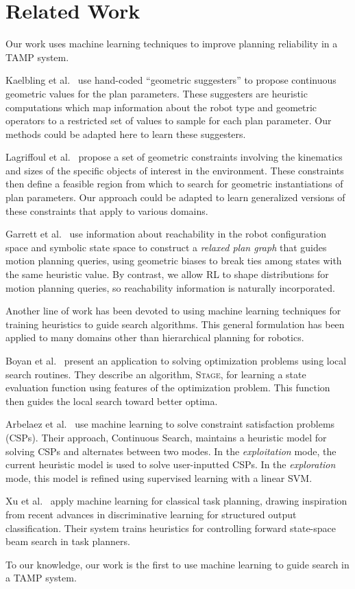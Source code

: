 \section{Related Work}
Our work uses machine learning techniques to improve planning reliability in a TAMP system.

Kaelbling et al.~\cite{kaelbling2011hierarchical} use hand-coded ``geometric suggesters'' to propose
continuous geometric values for the plan parameters. These suggesters are heuristic
computations which map information about the robot type and geometric operators to a restricted
set of values to sample for each plan parameter. Our methods could be adapted here to learn these
suggesters.

Lagriffoul et al.~\cite{lagriffoul2014orientation}
propose a set of geometric constraints involving the kinematics and sizes of the specific objects of
interest in the environment. These constraints then define a feasible region from which to search
for geometric instantiations of plan parameters. Our approach could be adapted to learn generalized
versions of these constraints that apply to various domains.

Garrett et al.~\cite{GarrettWAFR14} use information about reachability in the robot configuration
space and symbolic state space to construct a \emph{relaxed plan graph} that guides motion
planning queries, using geometric biases to break ties among states with the same heuristic value.
By contrast, we allow RL to shape distributions for motion planning queries, so reachability information
is naturally incorporated.

Another line of work has been devoted to using machine learning techniques for
training heuristics to guide search algorithms. This general formulation
has been applied to many domains other than hierarchical planning for robotics.

Boyan et al.~\cite{Boyanlearning} present an application to solving optimization
problems using local search routines. They describe an algorithm, \textsc{Stage},
for learning a state evaluation function using features of the optimization problem.
This function then guides the local search toward better optima.

Arbelaez et al.~\cite{hamadisearch} use machine learning to solve constraint
satisfaction problems (CSPs). Their approach, Continuous Search, maintains a heuristic
model for solving CSPs and alternates between two modes. In the \emph{exploitation} mode,
the current heuristic model is used to solve user-inputted CSPs. In the \emph{exploration}
mode, this model is refined using supervised learning with a linear SVM.

Xu et al.~\cite{Xu07discriminativelearning} apply machine learning for classical task
planning, drawing inspiration from recent advances in discriminative learning for
structured output classification. Their system trains heuristics for controlling forward
state-space beam search in task planners.

To our knowledge, our work is the first to use machine learning to guide search in a TAMP system.
